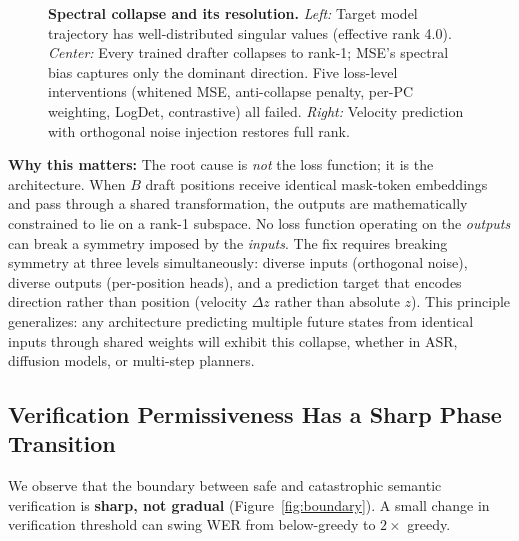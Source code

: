 \documentclass[11pt,a4paper]{article}
\begin{document}
\begin{figure}[H]
\caption{\textbf{Spectral collapse and its resolution.}
\emph{Left:} Target model trajectory has well-distributed singular values (effective rank 4.0).
\emph{Center:} Every trained drafter collapses to rank-1; MSE's spectral bias captures only the dominant direction.
Five loss-level interventions (whitened MSE, anti-collapse penalty, per-PC weighting, LogDet, contrastive) all failed.
\emph{Right:} Velocity prediction with orthogonal noise injection restores full rank.}
\label{fig:spectral}
\end{figure}

\noindent\textbf{Why this matters:}
The root cause is \emph{not} the loss function; it is the architecture.
When $B$ draft positions receive identical mask-token embeddings and pass through a shared transformation, the outputs are mathematically constrained to lie on a rank-1 subspace.
No loss function operating on the \emph{outputs} can break a symmetry imposed by the \emph{inputs}.
The fix requires breaking symmetry at three levels simultaneously: diverse inputs (orthogonal noise), diverse outputs (per-position heads), and a prediction target that encodes direction rather than position (velocity $\Delta z$ rather than absolute $z$).
This principle generalizes: any architecture predicting multiple future states from identical inputs through shared weights will exhibit this collapse, whether in ASR, diffusion models, or multi-step planners.

\subsection{Verification Permissiveness Has a Sharp Phase Transition}

We observe that the boundary between safe and catastrophic semantic verification is \textbf{sharp, not gradual} (Figure~\ref{fig:boundary}).
A small change in verification threshold can swing WER from below-greedy to $2\times$ greedy.
\end{document}

